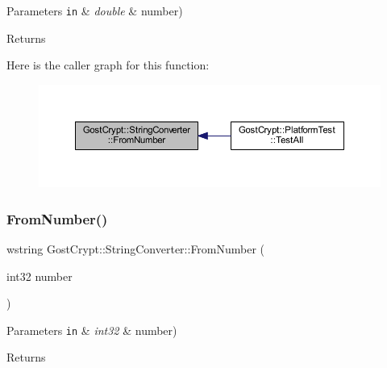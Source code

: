 \begin{DoxyParams}[1]{Parameters}
\mbox{\tt in}  & {\em double} & number) \\
\hline
\end{DoxyParams}
\begin{DoxyReturn}{Returns}

\end{DoxyReturn}
Here is the caller graph for this function\+:
\nopagebreak
\begin{figure}[H]
\begin{center}
\leavevmode
\includegraphics[width=350pt]{class_gost_crypt_1_1_string_converter_af2aafa018883a06911693cfa6cf051ee_icgraph}
\end{center}
\end{figure}
\mbox{\label{class_gost_crypt_1_1_string_converter_a4da6015d49ba8bd6d5b781168deae166}} 
\subsubsection{\texorpdfstring{From\+Number()}{FromNumber()}\hspace{0.1cm}{\footnotesize\ttfamily [2/5]}}
{\footnotesize\ttfamily wstring Gost\+Crypt\+::\+String\+Converter\+::\+From\+Number (\begin{DoxyParamCaption}\item[{int32}]{number }\end{DoxyParamCaption})\hspace{0.3cm}{\ttfamily [static]}}


\begin{DoxyParams}[1]{Parameters}
\mbox{\tt in}  & {\em int32} & number) \\
\hline
\end{DoxyParams}
\begin{DoxyReturn}{Returns}

\end{DoxyReturn}
\mbox{\label{class_gost_crypt_1_1_string_converter_aca86ecb3415db8026c585662c2c86540}} 
